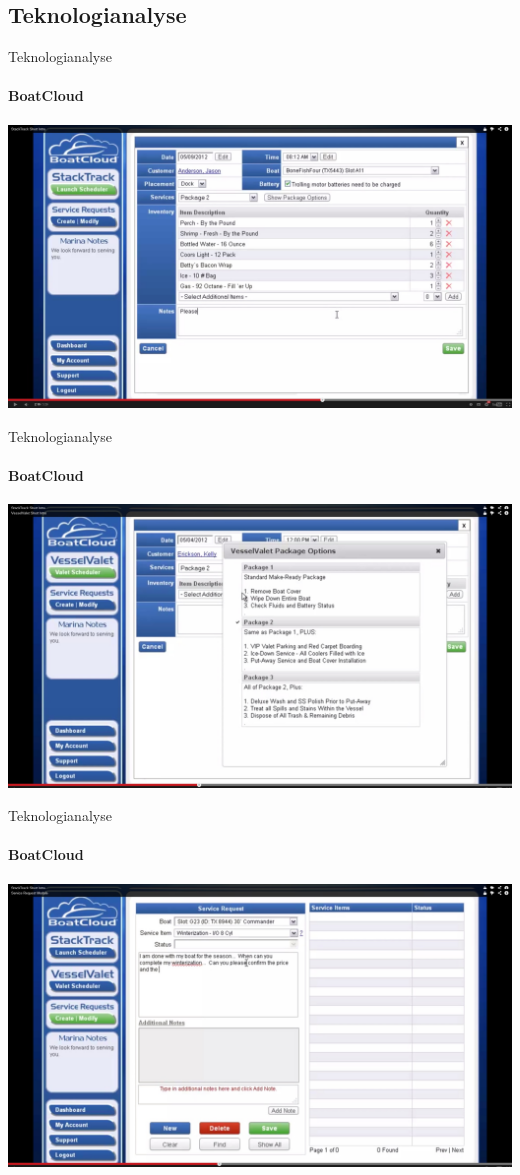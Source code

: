 \subsection{Teknologianalyse}
\begin{frame}{Teknologianalyse}
    \framesubtitle {BoatCloud}
        \includegraphics[width=1\textwidth]{images/StackTrack.jpg}
\end{frame}

\begin{frame}{Teknologianalyse}
    \framesubtitle {BoatCloud}
        \includegraphics[width=1\textwidth]{images/VesselValet.jpg}  
\end{frame}

\begin{frame}{Teknologianalyse}
    \framesubtitle {BoatCloud}
        \includegraphics[width=1\textwidth]{images/TicketTracker.jpg} 
\end{frame}

